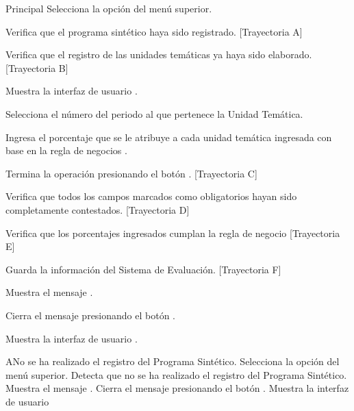 \begin{UCtrayectoria}{Principal}
    \UCpaso[\UCactor] Selecciona la opción  del menú superior.
    
    \UCpaso Verifica que el programa sintético haya sido registrado. [Trayectoria A]
    
    \UCpaso Verifica que el registro de las unidades temáticas ya haya sido elaborado. [Trayectoria B]
    
    \UCpaso Muestra la interfaz de usuario .
    
	\UCpaso[\UCactor] Selecciona el número del periodo al que pertenece la Unidad Temática.
	
	\UCpaso[\UCactor] Ingresa el porcentaje que se le atribuye a cada unidad temática ingresada con base en la regla de negocios .
	
	\UCpaso[\UCactor] Termina la operación presionando el botón . [Trayectoria C]
        
    \UCpaso Verifica que todos los campos marcados como obligatorios hayan sido completamente contestados. [Trayectoria D]
    
    \UCpaso Verifica que los porcentajes ingresados cumplan la regla de negocio  [Trayectoria E]
    
    \UCpaso Guarda la información del Sistema de Evaluación. [Trayectoria F]
    
    \UCpaso Muestra el mensaje .
    
    \UCpaso[\UCactor] Cierra el mensaje presionando el botón .
    
    \UCpaso Muestra la interfaz de usuario .
\end{UCtrayectoria}


\begin{UCtrayectoriaA}{A}{No se ha realizado el registro del Programa Sintético.}
    \UCpaso[\UCactor] Selecciona la opción  del menú superior.
    \UCpaso Detecta que no se ha realizado el registro del Programa Sintético.
        \UCpaso Muestra el mensaje .
    \UCpaso[\UCactor] Cierra el mensaje presionando el botón .
    \UCpaso Muestra la interfaz de usuario 
\end{UCtrayectoriaA}

